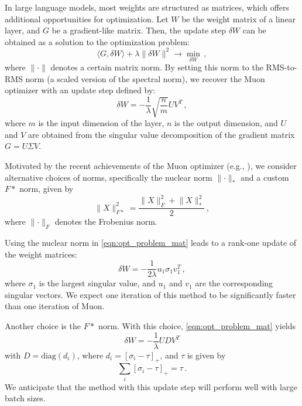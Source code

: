 \documentclass{article} %
\newcommand{\norm}[1]{\lVert #1\rVert}
\begin{document}
In large language models, most weights are structured as matrices, which offers additional opportunities for optimization. Let $W$ be the weight matrix of a linear layer, and $G$ be a gradient-like matrix. Then, the update step $\delta W$ can be obtained as a solution to the optimization problem:
\begin{equation}\label{eqn:opt_problem_mat}
  \langle G, \delta W \rangle + \lambda \norm{\delta W}^2 \to \min_{\delta W}\,,
\end{equation}
where $\norm{\cdot}$ denotes a certain matrix norm. By setting this norm to the RMS-to-RMS norm (a scaled version of the spectral norm), we recover the Muon optimizer \cite{bernstein2025deriving, bernstein2024oldoptimizernewnorm} with an update step defined by:
\begin{equation}\label{eqn:update_muon}
\delta W = - \frac{1}{\lambda}\sqrt{\frac{n}{m}}UV^T\,,
\end{equation}
where $m$ is the input dimension of the layer, $n$ is the output dimension, and $U$ and $V$ are obtained from the singular value decomposition of the gradient matrix $G = U \Sigma V$.

Motivated by the recent achievements of the Muon optimizer (e.g., \cite{liu2025muon}), we consider alternative choices of norms, specifically the nuclear norm $\norm{\cdot}_*$ and a custom $F*$ norm, given by 
\begin{equation}\label{eqn:F_star}
    \norm{X}_{F*}^2 = \frac{\norm{X}_F^2 + \norm{X}_*^2}{2}\,,
\end{equation}
where $\norm{\cdot}_F$ denotes the Frobenius norm.

Using the nuclear norm in \eqref{eqn:opt_problem_mat} leads to a rank-one update of the weight matrices:
\begin{equation}\label{eqn:update_star}
  \delta W = -\frac{1}{2\lambda} u_1 \sigma_1 v_1^T\,,
\end{equation}
where $\sigma_1$ is the largest singular value, and $u_1$ and $v_1$ are the corresponding singular vectors. We expect one iteration of this method to be significantly faster than one iteration of Muon.

Another choice is the $F*$ norm. With this choice, \eqref{eqn:opt_problem_mat} yields 
\begin{equation}\label{eqn:update_F_star}
\delta W = -\frac{1}{\lambda}UDV^T
\end{equation} 
with $D = \text{diag}(d_i)$, where $d_i = [\sigma_i - \tau]_+$, and $\tau$ is given by
\begin{equation}
    \sum_{i} [\sigma_i - \tau]_+ = \tau\,.
\end{equation}
We anticipate that the method with this update step will perform well with large batch sizes.
\end{document}
